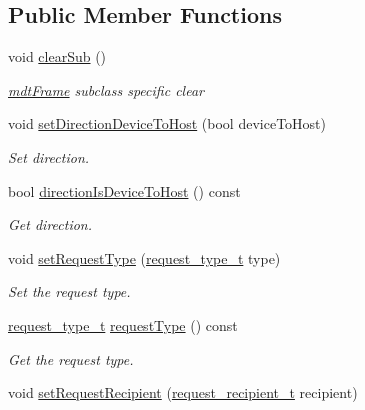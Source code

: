 \subsection*{Public Member Functions}
\begin{DoxyCompactItemize}
\item 
\hypertarget{classmdt_frame_usb_control_a04aab4a1e3efd99d805dffd8171e78de}{
void \hyperlink{classmdt_frame_usb_control_a04aab4a1e3efd99d805dffd8171e78de}{clearSub} ()}
\label{classmdt_frame_usb_control_a04aab4a1e3efd99d805dffd8171e78de}

\begin{DoxyCompactList}\small\item\em \hyperlink{classmdt_frame}{mdtFrame} subclass specific clear \end{DoxyCompactList}\item 
void \hyperlink{classmdt_frame_usb_control_aad3ab6ac60374075f13972679eed6a1b}{setDirectionDeviceToHost} (bool deviceToHost)
\begin{DoxyCompactList}\small\item\em Set direction. \end{DoxyCompactList}\item 
bool \hyperlink{classmdt_frame_usb_control_af1b656b1f1d41d40d8ae6e1e79d66092}{directionIsDeviceToHost} () const 
\begin{DoxyCompactList}\small\item\em Get direction. \end{DoxyCompactList}\item 
void \hyperlink{classmdt_frame_usb_control_a71457a757e5e6d85a1314c43cd9e93cb}{setRequestType} (\hyperlink{classmdt_frame_usb_control_a779262a63280a282343ada50acfda3d3}{request\_\-type\_\-t} type)
\begin{DoxyCompactList}\small\item\em Set the request type. \end{DoxyCompactList}\item 
\hyperlink{classmdt_frame_usb_control_a779262a63280a282343ada50acfda3d3}{request\_\-type\_\-t} \hyperlink{classmdt_frame_usb_control_a6af55e02c1f80cda83876825f151a28c}{requestType} () const 
\begin{DoxyCompactList}\small\item\em Get the request type. \end{DoxyCompactList}\item 
void \hyperlink{classmdt_frame_usb_control_a0cf8142890953b507ec2f6ae2003d137}{setRequestRecipient} (\hyperlink{classmdt_frame_usb_control_aaf1f08b1b5e47ab18426800ed0accbde}{request\_\-recipient\_\-t} recipient)

\end{DoxyCompactItemize}
